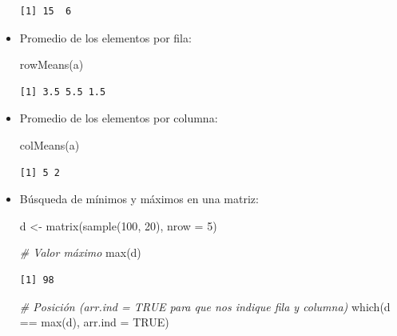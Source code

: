 \documentclass[
]{book}
\newenvironment{Shaded}{\begin{snugshade}}{\end{snugshade}}
\newcommand{\AttributeTok}[1]{\textcolor[rgb]{0.77,0.63,0.00}{#1}}
\newcommand{\CommentTok}[1]{\textcolor[rgb]{0.56,0.35,0.01}{\textit{#1}}}
\newcommand{\ConstantTok}[1]{\textcolor[rgb]{0.00,0.00,0.00}{#1}}
\newcommand{\DecValTok}[1]{\textcolor[rgb]{0.00,0.00,0.81}{#1}}
\newcommand{\FunctionTok}[1]{\textcolor[rgb]{0.00,0.00,0.00}{#1}}
\newcommand{\NormalTok}[1]{#1}
\newcommand{\OtherTok}[1]{\textcolor[rgb]{0.56,0.35,0.01}{#1}}
\newcommand{\SpecialCharTok}[1]{\textcolor[rgb]{0.00,0.00,0.00}{#1}}
\begin{document}
\begin{itemize}
\begin{verbatim}
[1] 15  6
\end{verbatim}
\item
  Promedio de los elementos por fila:

\begin{Shaded}
\begin{Highlighting}[]
\FunctionTok{rowMeans}\NormalTok{(a)}
\end{Highlighting}
\end{Shaded}

\begin{verbatim}
[1] 3.5 5.5 1.5
\end{verbatim}
\item
  Promedio de los elementos por columna:

\begin{Shaded}
\begin{Highlighting}[]
\FunctionTok{colMeans}\NormalTok{(a)}
\end{Highlighting}
\end{Shaded}

\begin{verbatim}
[1] 5 2
\end{verbatim}
\item
  Búsqueda de mínimos y máximos en una matriz:

\begin{Shaded}
\begin{Highlighting}[]
\NormalTok{d }\OtherTok{\textless{}{-}} \FunctionTok{matrix}\NormalTok{(}\FunctionTok{sample}\NormalTok{(}\DecValTok{100}\NormalTok{, }\DecValTok{20}\NormalTok{), }\AttributeTok{nrow =} \DecValTok{5}\NormalTok{)}

\CommentTok{\# Valor máximo}
\FunctionTok{max}\NormalTok{(d)}
\end{Highlighting}
\end{Shaded}

\begin{verbatim}
[1] 98
\end{verbatim}

\begin{Shaded}
\begin{Highlighting}[]
\CommentTok{\# Posición (arr.ind = TRUE para que nos indique fila y columna)}
\FunctionTok{which}\NormalTok{(d }\SpecialCharTok{==} \FunctionTok{max}\NormalTok{(d), }\AttributeTok{arr.ind =} \ConstantTok{TRUE}\NormalTok{)}
\end{Highlighting}
\end{Shaded}


\end{itemize}
\end{document}
